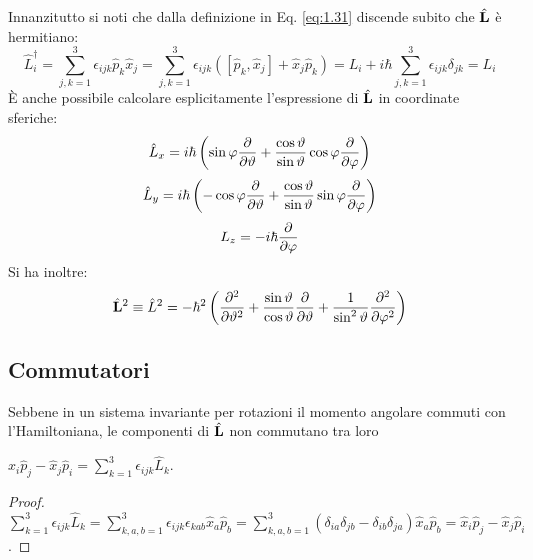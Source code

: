 Innanzitutto si noti che dalla definizione in Eq. \ref{eq:1.31} discende subito che $ \hat{\mathbf{L}} $ è hermitiano:
\begin{equation}
	\hat{L}_i^{\dagger} = \sum_{j,k = 1}^{3} \epsilon_{ijk} \hat{p}_k \hat{x}_j = \sum_{j,k = 1}^{3} \epsilon_{ijk} \left( [\hat{p}_k,\hat{x}_j] + \hat{x}_j \hat{p}_k \right) = L_i + i\hbar \sum_{j,k = 1}^{3} \epsilon_{ijk} \delta_{jk} = L_i
	\label{eq:2.6}
\end{equation}
È anche possibile calcolare esplicitamente l'espressione di $ \hat{\mathbf{L}} $ in coordinate sferiche:
\begin{equation}
	\hat{L}_x = i\hbar \left( \sin \varphi \frac{\partial}{\partial \vartheta} + \frac{\cos \vartheta}{\sin \vartheta} \cos \varphi \frac{\partial}{\partial \varphi} \right)
	\label{eq:2.7}
\end{equation}
\begin{equation}
	\hat{L}_y = i\hbar \left( -\cos \varphi \frac{\partial}{\partial \vartheta} + \frac{\cos \vartheta}{\sin \vartheta} \sin \varphi \frac{\partial}{\partial \varphi} \right)
	\label{eq:2.8}
\end{equation}
\begin{equation}
	L_z = -i\hbar \frac{\partial}{\partial \varphi}
	\label{eq:2.9}
\end{equation}
Si ha inoltre:
\begin{equation}
	\hat{\mathbf{L}}^2 \equiv \hat{L}^2 = -\hbar^2 \left( \frac{\partial^2}{\partial \vartheta^2} + \frac{\sin \vartheta}{\cos \vartheta} \frac{\partial}{\partial \vartheta} + \frac{1}{\sin^2 \vartheta} \frac{\partial^2}{\partial \varphi^2} \right)
	\label{eq:2.10}
\end{equation}

\subsection{Commutatori}

Sebbene in un sistema invariante per rotazioni il momento angolare commuti con l'Hamiltoniana, le componenti di $ \hat{\mathbf{L}} $ non commutano tra loro

\begin{lemma}\label{lem-l-comm}
	$ \hat{x}_i \hat{p}_j - \hat{x}_j \hat{p}_i = \sum_{k = 1}^{3} \epsilon_{ijk}	\hat{L}_k $.
\end{lemma}
\begin{proof}
	$ \sum_{k = 1}^{3} \epsilon_{ijk} \hat{L}_k = \sum_{k,a,b = 1}^{3} \epsilon_{ijk}\epsilon_{kab} \hat{x}_a \hat{p}_b = \sum_{k,a,b = 1}^{3} \left( \delta_{ia}\delta_{jb} - \delta_{ib}\delta_{ja} \right) \hat{x}_a \hat{p}_b = \hat{x}_i \hat{p}_j - \hat{x}_j \hat{p}_i $.
\end{proof}

